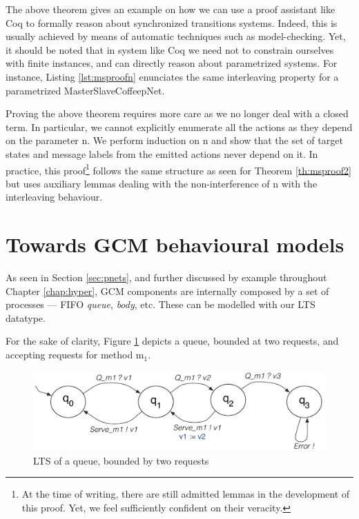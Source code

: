 	The above theorem gives an example on how we can use a proof assistant like Coq to formally reason about
	synchronized transitions systems. Indeed, this is usually achieved by means of automatic techniques such
	as model-checking. Yet, it should be noted that in system like Coq we need not to constrain ourselves
	with finite instances, and can directly reason about parametrized systems. 
	For instance, Listing \ref{lst:msproofn} enunciates the same interleaving property for a parametrized
	\textsf{MasterSlaveCoffeepNet}.

					

	Proving the above theorem requires more care as we no longer deal with a closed term.
	In particular, we cannot explicitly enumerate all the \textsf{actions} as they depend on 
	the parameter \textsf{n}.	We perform induction on \textsf{n} and show that
	the set of target states and message labels from the emitted \textsf{actions} never depend on it. 
	In practice, this proof\footnote{At the time of writing, there are still admitted lemmas in the development of this proof. 
	Yet, we feel sufficiently confident on their veracity.}
	follows the same structure as seen for Theorem \ref{th:msproof2} but 	uses auxiliary lemmas 
	dealing with the non-interference of \textsf{n} with the interleaving behaviour.
	
		
		
\section{Towards GCM behavioural models}
\label{sec:gcmpnets}


	 As seen in Section \ref{sec:pnets}, and further discussed by example throughout Chapter \ref{chap:hyper},
   \ac{GCM} components are internally composed by a set of processes --- \ac{FIFO} \textit{queue}, \textit{body}, 
   etc. These can be modelled with our \textsf{LTS} datatype.
   
   
	For the sake of clarity, Figure \ref{fig:gcmqueue2} depicts a queue, bounded at two requests, and accepting
	requests for method \textsf{m$_1$}.
	
	\begin{figure}[H]
		 \centering
		\includegraphics[scale=0.6]{figures/chapter6/gcmqueue2.pdf}
		\caption{LTS of a queue, bounded by two requests}
		\label{fig:gcmqueue2}		
	\end{figure}		
	
